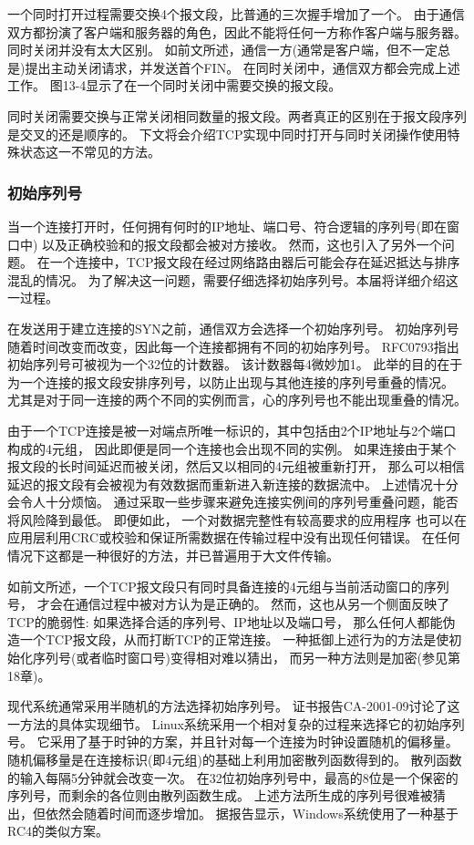 \documentclass{../main.tex}{subfiles}
\begin{document}
一个同时打开过程需要交换4个报文段，比普通的三次握手增加了一个。
由于通信双方都扮演了客户端和服务器的角色，因此不能将任何一方称作客户端与服务器。
同时关闭并没有太大区别。
如前文所述，通信一方(通常是客户端，但不一定总是)提出主动关闭请求，并发送首个FIN。
在同时关闭中，通信双方都会完成上述工作。
图13-4显示了在一个同时关闭中需要交换的报文段。

同时关闭需要交换与正常关闭相同数量的报文段。两者真正的区别在于报文段序列是交叉的还是顺序的。
下文将会介绍TCP实现中同时打开与同时关闭操作使用特殊状态这一不常见的方法。


\subsubsection{初始序列号}
当一个连接打开时，任何拥有何时的IP地址、端口号、符合逻辑的序列号(即在窗口中)
    以及正确校验和的报文段都会被对方接收。
然而，这也引入了另外一个问题。
在一个连接中，TCP报文段在经过网络路由器后可能会存在延迟抵达与排序混乱的情况。
为了解决这一问题，需要仔细选择初始序列号。本届将详细介绍这一过程。

在发送用于建立连接的SYN之前，通信双方会选择一个初始序列号。
初始序列号随着时间改变而改变，因此每一个连接都拥有不同的初始序列号。
RFC0793指出初始序列号可被视为一个32位的计数器。
该计数器每4微妙加1。
此举的目的在于为一个连接的报文段安排序列号，以防止出现与其他连接的序列号重叠的情况。
尤其是对于同一连接的两个不同的实例而言，心的序列号也不能出现重叠的情况。

由于一个TCP连接是被一对端点所唯一标识的，其中包括由2个IP地址与2个端口构成的4元组，
    因此即便是同一个连接也会出现不同的实例。
如果连接由于某个报文段的长时间延迟而被关闭，然后又以相同的4元组被重新打开，
    那么可以相信延迟的报文段有会被视为有效数据而重新进入新连接的数据流中。
上述情况十分会令人十分烦恼。
通过采取一些步骤来避免连接实例间的序列号重叠问题，能否将风险降到最低。
即便如此，
    一个对数据完整性有较高要求的应用程序
    也可以在应用层利用CRC或校验和保证所需数据在传输过程中没有出现任何错误。
在任何情况下这都是一种很好的方法，并已普遍用于大文件传输。

如前文所述，一个TCP报文段只有同时具备连接的4元组与当前活动窗口的序列号，
    才会在通信过程中被对方认为是正确的。
然而，这也从另一个侧面反映了TCP的脆弱性:
如果选择合适的序列号、IP地址以及端口号，
    那么任何人都能伪造一个TCP报文段，从而打断TCP的正常连接。
一种抵御上述行为的方法是使初始化序列号(或者临时窗口号)变得相对难以猜出，
    而另一种方法则是加密(参见第18章)。

现代系统通常采用半随机的方法选择初始序列号。
证书报告CA-2001-09讨论了这一方法的具体实现细节。
Linux系统采用一个相对复杂的过程来选择它的初始序列号。
它采用了基于时钟的方案，并且针对每一个连接为时钟设置随机的偏移量。
随机偏移量是在连接标识(即4元组)的基础上利用加密散列函数得到的。
散列函数的输入每隔5分钟就会改变一次。
在32位初始序列号中，最高的8位是一个保密的序列号，而剩余的各位则由散列函数生成。
上述方法所生成的序列号很难被猜出，但依然会随着时间而逐步增加。
据报告显示，Windows系统使用了一种基于RC4的类似方案。
\end{document}
